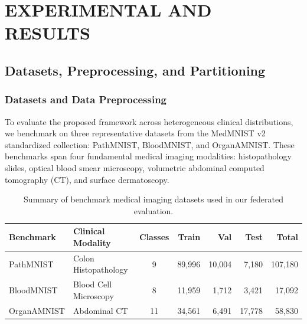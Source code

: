 \chapter{EXPERIMENTAL AND RESULTS}

\ifpdf
    \graphicspath{{Chapter4/Figs/Raster/}{Chapter4/Figs/PDF/}{Chapter4/Figs/}}
\else
    \graphicspath{{Chapter4/Figs/Vector/}{Chapter4/Figs/}}
\fi

\section{Datasets, Preprocessing, and Partitioning}
\subsection{Datasets and Data Preprocessing}
To evaluate the proposed framework across heterogeneous clinical distributions, we benchmark on three representative datasets from the MedMNIST v2 \cite{yang2023medmnist} standardized collection: PathMNIST, BloodMNIST, and OrganAMNIST. These benchmarks span four fundamental medical imaging modalities: histopathology slides, optical blood smear microscopy, volumetric abdominal computed tomography (CT), and surface dermatoscopy.

\begin{table}[htbp]
\centering
\caption{Summary of benchmark medical imaging datasets used in our federated evaluation.}
\label{tab:datasets}
\small
\begin{tabular}{llcrrrr}
\toprule
\textbf{Benchmark} & \textbf{Clinical Modality} & \textbf{Classes} & \textbf{Train} & \textbf{Val} & \textbf{Test} & \textbf{Total} \\
\midrule
PathMNIST    & Colon Histopathology  & 9  & 89,996 & 10,004 & 7,180  & 107,180 \\
BloodMNIST   & Blood Cell Microscopy & 8  & 11,959 &  1,712 & 3,421  &  17,092 \\
OrganAMNIST  & Abdominal CT          & 11 & 34,561 &  6,491 & 17,778 &  58,830 \\
\bottomrule
\end{tabular}
\end{table}

